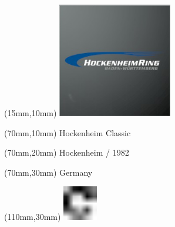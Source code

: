 \null\newpage
\begin{textblock*}{50mm}(15mm,10mm)%
\includegraphics[width=50mm]{LG/2015-05-20_00082.png}
\end{textblock*}
\begin{textblock*}{130mm}(70mm,10mm)%
{\fontsize{20}{20}\selectfont Hockenheim Classic}\\
\end{textblock*}
\begin{textblock*}{120mm}(70mm,20mm)%
{\fontsize{16}{16}\selectfont Hockenheim / 1982}\\
\end{textblock*}
\begin{textblock*}{120mm}(70mm,30mm)%
{\fontsize{12}{12}\selectfont Germany}
\end{textblock*}
\begin{textblock*}{30mm}(110mm,30mm)%
\centering
\includegraphics[height=15mm]{icons/fa-rotate-right.pdf}
\end{textblock*}
